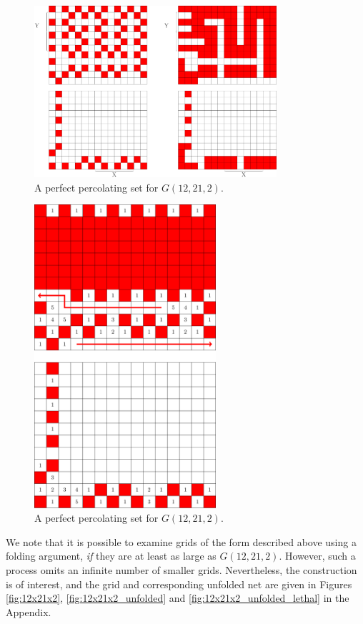 \begin{figure}[]
\centering
\includegraphics[width=0.8\textwidth]{figures/7/12x15x2.pdf}
\caption{A perfect percolating set for $G(12,21,2)$.}
\label{fig:12x15x2}
\end{figure} 

\begin{figure}[]
\centering
\includegraphics[width=0.6\textwidth]{figures/7/12x15x2_L1_numbered_heatmap.pdf}
\caption{A perfect percolating set for $G(12,21,2)$.}
\label{fig:12x15x2_L1}
\end{figure} 

We note that it is possible to examine grids of the form described above using a folding argument, \emph{if} they are at least as large as $G(12,21,2)$. However, such a process omits an infinite number of smaller grids. Nevertheless, the construction is of interest, and the grid and corresponding unfolded net are given in Figures \ref{fig:12x21x2}, \ref{fig:12x21x2_unfolded} and \ref{fig:12x21x2_unfolded_lethal} in the Appendix. 

